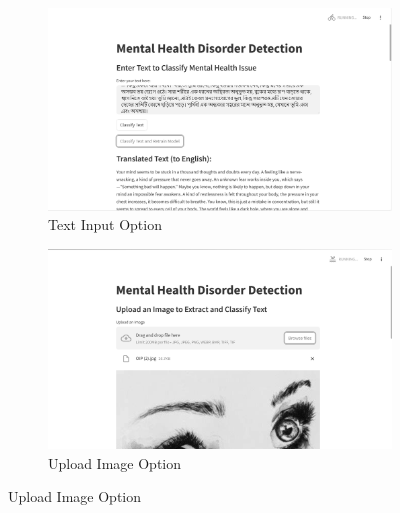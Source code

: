 \begin{figure}[H]
    \centering
    \begin{subfigure}[b]{0.495\textwidth}
        \centering
        \includegraphics[width=\textwidth]{App Images/02 Interface.png}
        \caption{Text Input Option}
        \label{fig:02i}
    \end{subfigure}
    \hfill
    \begin{subfigure}[b]{0.495\textwidth}
        \centering
        \includegraphics[width=\textwidth]{App Images/04 Interface.png}
        \caption{Upload Image Option}
        \label{fig:04i}
    \end{subfigure}

    \vspace{1em}


\end{figure}
